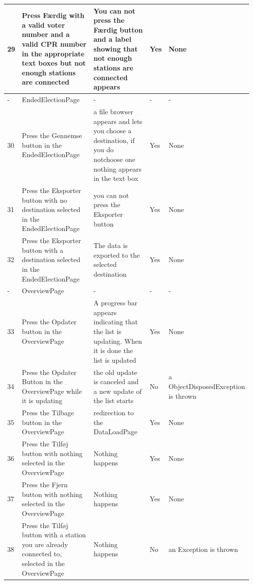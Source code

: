 \documentclass[a4paper]{report}
\begin{document}
\begin{longtable}{|p{5mm}|p{}|p{}|p{}|p{}|}
\\\hline
29 & Press F\ae rdig with a valid voter number and a valid CPR number in the appropriate text boxes but not enough stations are connected & You can not press the F\ae rdig button and a label showing that not enough stations are connected appears & Yes & None 

\\\hline
- & EndedElectionPage & - & - & -    

 \\\hline
30 & Press the Gennemse button in the EndedElectionPage & a file browser appears and lets you choose a destination, if you do notchoose one nothing appears in the text box & Yes & None 

 \\\hline
31 & Press the Eksporter button with no destination selected in the EndedElectionPage & you can not press the Eksporter button & Yes & None 

 \\\hline
32 & Press the Eksporter button with a destination selected in the EndedElectionPage & The data is exported to the selected destination & Yes & None 

\\\hline
- & OverviewPage & - & - & -

 \\\hline
33 & Press the Opdater button in the OverviewPage & A progress bar appears indicating that the list is updating. When it is done the list is updated  & Yes & None 

 \\\hline
34 & Press the Opdater Button in the OverviewPage while it is updating & the old update is canceled and a new update of the list starts & No & a ObjectDisposedException is thrown

 \\\hline
35 & Press the Tilbage button in the OverviewPage & redirection to the DataLoadPage & Yes & None

 \\\hline
36 & Press the Tilf\o j button with nothing selected in the OverviewPage & Nothing happens & Yes & None

 \\\hline
37 & Press the Fjern button with nothing selected in the OverviewPage & Nothing happens & Yes & None

 \\\hline
38 & Press the Tilf\o j button with a station you are already connected to, selected in the OverviewPage & Nothing happens & No & an Exception is thrown


\end{longtable}
\end{document}
